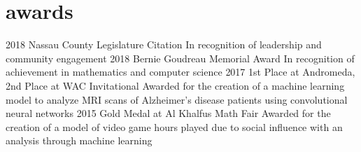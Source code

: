 \documentclass[]{friggeri-cv}
\begin{document}
\section{awards}
\begin{entrylist}
    \entry
    {2018}
    {Nassau County Legislature Citation}
    {}
    {In recognition of leadership and community engagement} 
    \entry
    {2018}
    {Bernie Goudreau Memorial Award}
    {}
    {In recognition of achievement in mathematics and computer science}
    \entry
    {2017}
    {1st Place at Andromeda, 2nd Place at WAC Invitational}
    {}
    {Awarded for the creation of a machine learning model to analyze MRI scans of Alzheimer’s disease patients using convolutional neural networks}
    \entry
    {2015}
    {Gold Medal at Al Khalfus Math Fair}
    {}
    {Awarded for the creation of a
    model of video game hours played due to social influence with an analysis through machine learning}
\end{entrylist}
\end{document}
